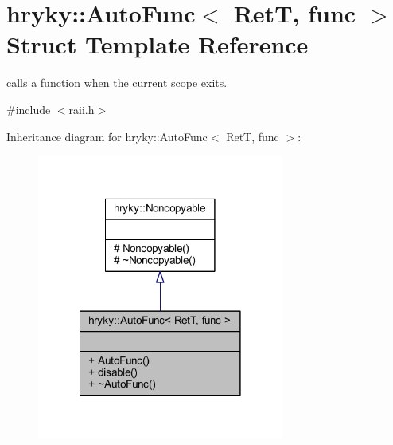 \hypertarget{structhryky_1_1_auto_func}{\section{hryky\-:\-:Auto\-Func$<$ Ret\-T, func $>$ Struct Template Reference}
\label{structhryky_1_1_auto_func}
}


calls a function when the current scope exits.  




{\ttfamily \#include $<$raii.\-h$>$}



Inheritance diagram for hryky\-:\-:Auto\-Func$<$ Ret\-T, func $>$\-:\nopagebreak
\begin{figure}[H]
\begin{center}
\leavevmode
\includegraphics[width=230pt]{structhryky_1_1_auto_func__inherit__graph}
\end{center}
\end{figure}
